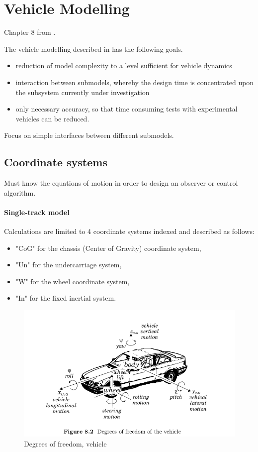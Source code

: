 \section{Vehicle Modelling}
Chapter 8 from \cite{kiencke}. 

The vehicle modelling described in \cite{kiencke} has the following goals.
\begin{itemize}
    \item reduction of model complexity to a level sufficient for vehicle dynamics
   \item interaction between submodels, whereby the design time is concentrated upon the subsystem currently under investigation 
   \item only necessary accuracy, so that time consuming tests with experimental vehicles can be reduced.
\end{itemize}

Focus on simple interfaces between different submodels.

\subsection{Coordinate systems}
Must know the equations of motion in order to design an observer or control algorithm. 

\paragraph{Single-track model}

Calculations are limited to 4 coordinate systems indexed and described as follows:
\begin{itemize}
    \item "CoG" for the chassis (Center of Gravity) coordinate system,
    \item "Un" for the undercarriage system,
    \item "W" for the wheel coordinate system,
    \item "In" for the fixed inertial system.
\end{itemize}

\begin{figure}
    \centering
    \includegraphics[width=\textwidth]{draft/stolen-figures/dof-vehicle.png}
    \caption{Degrees of freedom, vehicle}
    \label{fig:dof-vehicle}
\end{figure}

